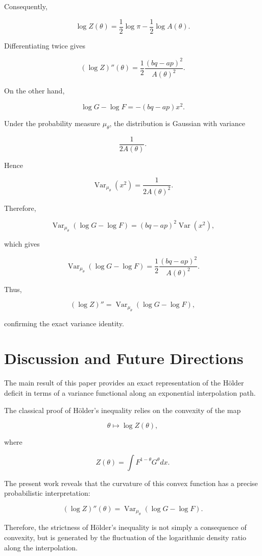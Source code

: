 \documentclass[11pt]{amsart}
\begin{document}
Consequently,

\[
\log Z(\theta)
=
\frac12
\log\pi
-
\frac12
\log A(\theta).
\]

Differentiating twice gives

\[
(\log Z)''(\theta)
=
\frac12
\frac{
(bq-ap)^2
}{
A(\theta)^2
}.
\]

On the other hand,

\[
\log G-\log F
=
-(bq-ap)x^2 .
\]

Under the probability measure $\mu_\theta$, the distribution is
Gaussian with variance

\[
\frac1{2A(\theta)}.
\]

Hence

\[
\operatorname{Var}_{\mu_\theta}(x^2)
=
\frac1{2A(\theta)^2}.
\]

Therefore,

\[
\operatorname{Var}_{\mu_\theta}
(
\log G-\log F
)
=
(bq-ap)^2
\operatorname{Var}(x^2),
\]

which gives

\[
\operatorname{Var}_{\mu_\theta}
(
\log G-\log F
)
=
\frac12
\frac{
(bq-ap)^2
}{
A(\theta)^2
}.
\]

Thus,

\[
(\log Z)''
=
\operatorname{Var}_{\mu_\theta}
(
\log G-\log F
),
\]

confirming the exact variance identity.

\section{Discussion and Future Directions}


The main result of this paper provides an exact representation of
the Hölder deficit in terms of a variance functional along an
exponential interpolation path.

The classical proof of Hölder's inequality relies on the convexity
of the map

\[
\theta\mapsto \log Z(\theta),
\]

where

\[
Z(\theta)
=
\int F^{1-\theta}G^\theta dx .
\]

The present work reveals that the curvature of this convex function
has a precise probabilistic interpretation:

\[
(\log Z)''(\theta)
=
\operatorname{Var}_{\mu_\theta}
(
\log G-\log F
).
\]

Therefore, the strictness of Hölder's inequality is not simply a
consequence of convexity, but is generated by the fluctuation of the
logarithmic density ratio along the interpolation.
\end{document}

